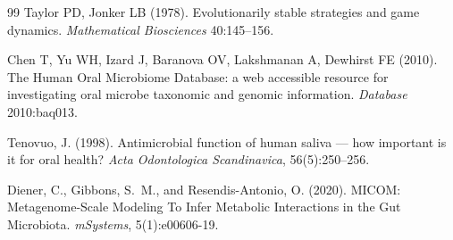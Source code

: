 \documentclass[11pt,a4paper]{article}
\begin{document}
\begin{thebibliography}{99}
Taylor PD, Jonker LB (1978). Evolutionarily stable strategies and game dynamics.
\textit{Mathematical Biosciences} 40:145--156.

Chen T, Yu WH, Izard J, Baranova OV, Lakshmanan A, Dewhirst FE (2010).
The Human Oral Microbiome Database: a web accessible resource for investigating oral
microbe taxonomic and genomic information.
\textit{Database} 2010:baq013.

Tenovuo, J. (1998).
Antimicrobial function of human saliva --- how important is it for oral health?
\textit{Acta Odontologica Scandinavica}, 56(5):250--256.

Diener, C., Gibbons, S.~M., and Resendis-Antonio, O. (2020).
MICOM: Metagenome-Scale Modeling To Infer Metabolic Interactions in the Gut Microbiota.
\textit{mSystems}, 5(1):e00606-19.

\end{thebibliography}
\end{document}
